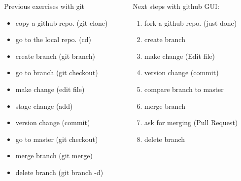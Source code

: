 \begin{frame}{ }
\begin{columns}
\begin{column}{0.49\textwidth}
\begin{exampleblock}{Previous exercises with git}
\begin{itemize}
    \item copy a github repo. (git clone)
    \item go to the local repo. (cd)
    \item create branch (git branch)
    \item go to branch (git checkout)
    \item make change (edit file)
    \item stage change (add)
    \item version change (commit)
    \item go to master (git checkout)
    \item merge branch (git merge)
    \item delete branch (git branch -d)
\end{itemize}
\end{exampleblock}
\end{column}
\begin{column}{0.49\textwidth}
\begin{exampleblock}{Next steps with github GUI:}
\begin{enumerate}
    \item fork a github repo. (just done)
    \item create branch 
    \item make change (Edit file)
    \item version change (commit)
    \item compare branch to master
    \item merge branch 
    \item ask for merging (Pull Request)
    \item delete branch
\end{enumerate}
\end{exampleblock}
\end{column}
\end{columns}
\end{frame}


